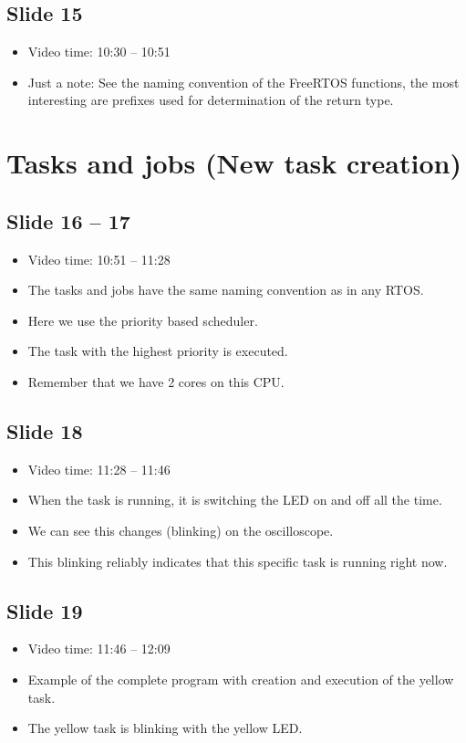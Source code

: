 \documentclass[12pt, a4paper]{article}
\begin{document}
	\subsection{Slide 15}
	\begin{itemize}
		\item Video time: 10:30 -- 10:51
		\item Just a note: See the naming convention of the FreeRTOS functions, the most interesting are prefixes used for determination of the return type.
	\end{itemize}

	\section{Tasks and jobs (New task creation)}
	\subsection{Slide 16 -- 17}
	\begin{itemize}
		\item Video time: 10:51 -- 11:28
		\item The tasks and jobs have the same naming convention as in any RTOS.
		\item Here we use the priority based scheduler.
		\item The task with the highest priority is executed.
		\item Remember that we have 2 cores on this CPU.
	\end{itemize}

	\subsection{Slide 18}
	\begin{itemize}
		\item Video time: 11:28 -- 11:46
		\item When the task is running, it is switching the LED on and off all the time.
		\item We can see this changes (blinking) on the oscilloscope.
		\item This blinking reliably indicates that this specific task is running right now.
	\end{itemize}

	\subsection{Slide 19}
	\begin{itemize}
		\item Video time: 11:46 -- 12:09
		\item Example of the complete program with creation and execution of the yellow task.
		\item The yellow task is blinking with the yellow LED.
	\end{itemize}
\end{document}
